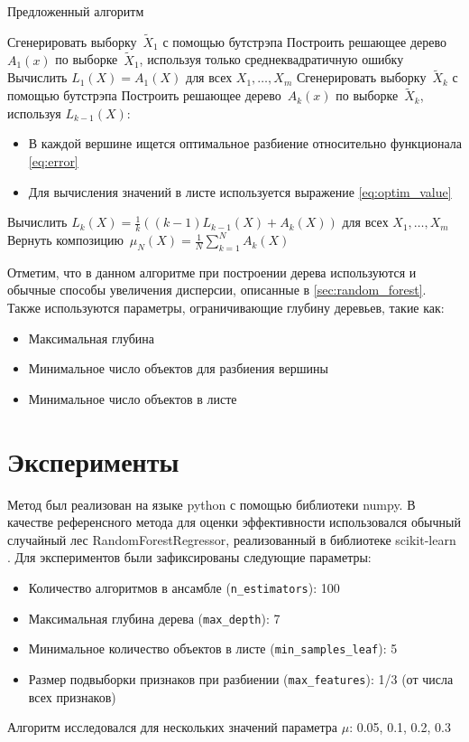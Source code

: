 \documentclass{article}
\begin{document}
\begin{algorithm}[H]
\caption{Предложенный алгоритм}
    \begin{algorithmic}[1]
      \STATE Сгенерировать выборку~$\tilde X_1$ с помощью бутстрэпа
      \STATE Построить решающее дерево~$A_1(x)$ по выборке~$\tilde X_1$, используя только среднеквадратичную ошибку
      \STATE Вычислить $L_1(X) = A_1(X)$ для всех $X_1, \dots, X_m$
            \STATE Сгенерировать выборку~$\tilde X_k$ с помощью бутстрэпа
            \STATE Построить решающее дерево~$A_k(x)$ по выборке~$\tilde X_k$, используя $L_{k-1}(X)$:
                \begin{itemize}
                    \item В каждой вершине ищется оптимальное разбиение относительно функционала \eqref{eq:error}
                    \item Для вычисления значений в листе используется выражение \eqref{eq:optim_value}
                \end{itemize}
              
            \STATE Вычислить $L_{k}(X) = \frac{1}{k} ((k-1)L_{k-1}(X) + A_k(X))$ для всех $X_1, \dots, X_m$
        \ENDFOR
        \STATE Вернуть композицию~$\mu_N(X) = \frac{1}{N} \sum_{k = 1}^{N} A_k(X)$
    \end{algorithmic}
\end{algorithm}

Отметим, что в данном алгоритме при построении дерева используются и обычные способы увеличения дисперсии, описанные в \autoref{sec:random_forest}. Также используются параметры, ограничивающие глубину деревьев, такие как:
\begin{itemize}
  \item Максимальная глубина
  \item Минимальное число объектов для разбиения вершины
  \item Минимальное число объектов в листе
\end{itemize}

\section{Эксперименты}
Метод был реализован на языке python с помощью библиотеки numpy. В качестве референсного метода для оценки эффективности использовался обычный случайный лес RandomForestRegressor, реализованный в библиотеке  scikit-learn \cite{scikit-learn}. Для экспериментов были зафиксированы следующие параметры:
\begin{itemize}
  \item Количество алгоритмов в ансамбле (\lstinline|n_estimators|): 100
  \item Максимальная глубина дерева (\lstinline|max_depth|): 7
  \item Минимальное количество объектов в листе (\lstinline|min_samples_leaf|): 5
  \item Размер подвыборки признаков при разбиении (\lstinline|max_features|): 1/3 (от числа всех признаков)
\end{itemize}
Алгоритм исследовался для нескольких значений параметра $\mu$: 0.05, 0.1, 0.2, 0.3
\end{document}
